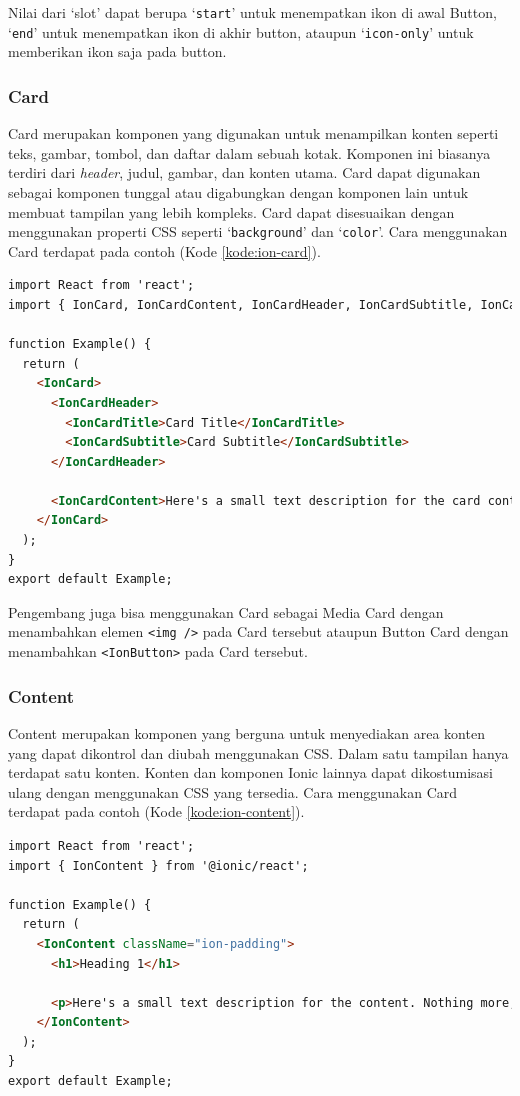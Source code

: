 Nilai dari `slot' dapat berupa `\texttt{start}' untuk menempatkan ikon di awal Button, `\texttt{end}' untuk menempatkan ikon di akhir button, ataupun `\texttt{icon-only}' untuk memberikan ikon saja pada button.

\subsubsection{Card}
Card merupakan komponen yang digunakan untuk menampilkan konten seperti teks, gambar, tombol, dan daftar dalam sebuah kotak. Komponen ini biasanya terdiri dari \textit{header}, judul, gambar, dan konten utama. Card dapat digunakan sebagai komponen tunggal atau digabungkan dengan komponen lain untuk membuat tampilan yang lebih kompleks. Card dapat disesuaikan dengan menggunakan properti CSS seperti `\texttt{background}' dan `\texttt{color}'. Cara menggunakan Card terdapat pada contoh (Kode \ref{kode:ion-card}).

\begin{lstlisting}[language=HTML, caption=Contoh Potongan Kode Card, label=kode:ion-card]
import React from 'react';
import { IonCard, IonCardContent, IonCardHeader, IonCardSubtitle, IonCardTitle } from '@ionic/react';

function Example() {
  return (
    <IonCard>
      <IonCardHeader>
        <IonCardTitle>Card Title</IonCardTitle>
        <IonCardSubtitle>Card Subtitle</IonCardSubtitle>
      </IonCardHeader>

      <IonCardContent>Here's a small text description for the card content. Nothing more, nothing less.</IonCardContent>
    </IonCard>
  );
}
export default Example;
\end{lstlisting}

Pengembang juga bisa menggunakan Card sebagai Media Card dengan menambahkan elemen \texttt{<img />} pada Card tersebut ataupun Button Card dengan menambahkan \texttt{<IonButton>} pada Card tersebut.

\subsubsection{Content}
Content merupakan komponen yang berguna untuk menyediakan area konten yang dapat dikontrol dan diubah menggunakan CSS. Dalam satu tampilan hanya terdapat satu konten. Konten dan komponen Ionic lainnya dapat dikostumisasi ulang dengan menggunakan CSS yang tersedia. Cara menggunakan Card terdapat pada contoh (Kode \ref{kode:ion-content}).

\begin{lstlisting}[language=HTML, caption=Contoh Potongan Kode Content, label=kode:ion-content]
import React from 'react';
import { IonContent } from '@ionic/react';

function Example() {
  return (
    <IonContent className="ion-padding">
      <h1>Heading 1</h1>

      <p>Here's a small text description for the content. Nothing more, nothing less.</p>
    </IonContent>
  );
}
export default Example;
\end{lstlisting}

